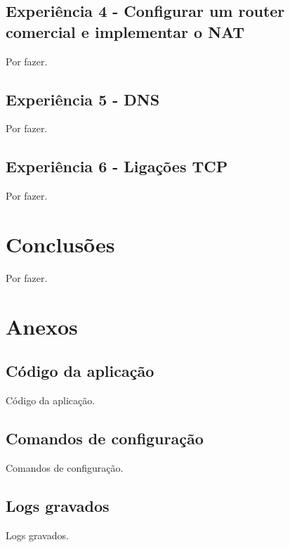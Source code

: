 \documentclass[a4paper]{article}
\begin{document}
\subsection{Experiência 4 - Configurar um router comercial e implementar o NAT}
Por fazer.

\subsection{Experiência 5 - DNS}
Por fazer.

\subsection{Experiência 6 - Ligações TCP}
Por fazer.

\section{Conclusões}
Por fazer.

\clearpage
{}
\renewcommand\refname{Referências}




\newpage
\appendix
\section{Anexos}

\subsection{Código da aplicação}
Código da aplicação.

\subsection{Comandos de configuração}
Comandos de configuração.

\subsection{Logs gravados}
Logs gravados.
\end{document}
